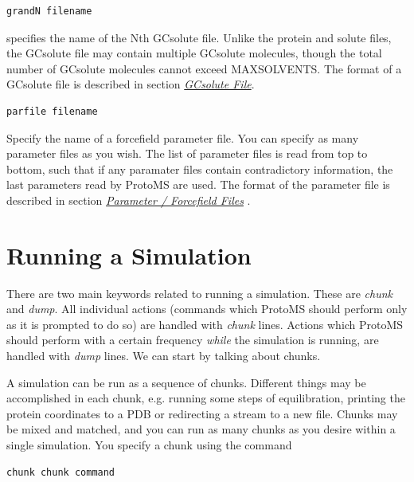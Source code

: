 \documentclass[letterpaper,10pt,english]{sphinxmanual}
\begin{document}
\begin{Verbatim}[commandchars=\\\{\}]
grandN filename
\end{Verbatim}

specifies the name of the Nth GCsolute file. Unlike the protein and solute files, the GCsolute file may contain multiple GCsolute molecules, though the total number of GCsolute molecules cannot exceed MAXSOLVENTS. The format of a GCsolute file is described in section {\hyperref[protoms:gcpdb]{\emph{GCsolute File}}}.

\begin{Verbatim}[commandchars=\\\{\}]
parfile filename
\end{Verbatim}

Specify the name of a forcefield parameter file. You can specify as many parameter files as you wish. The list of parameter files is read from top to bottom, such that if any paramater files contain contradictory information, the last parameters read by ProtoMS are used. The format of the parameter file is described in section {\hyperref[protoms:parfil]{\emph{Parameter / Forcefield Files}}} .


\section{Running a Simulation}
\label{protoms:running-a-simulation}\label{protoms:runcmd}
There are two main keywords related to running a simulation. These are \emph{chunk} and \emph{dump}. All individual actions (commands which ProtoMS should perform only as it is prompted to do so) are handled with \emph{chunk} lines. Actions which ProtoMS should perform with a certain frequency \emph{while} the simulation is running, are handled with \emph{dump} lines. We can start by talking about chunks.

A simulation can be run as a sequence of chunks. Different things may be accomplished in each chunk, e.g. running some steps of equilibration, printing the protein coordinates to a PDB or redirecting a stream to a new file. Chunks may be mixed and matched, and you can run as many chunks as you desire within a single simulation. You specify a chunk using the command

\begin{Verbatim}[commandchars=\\\{\}]
chunk chunk command
\end{Verbatim}
\end{document}
